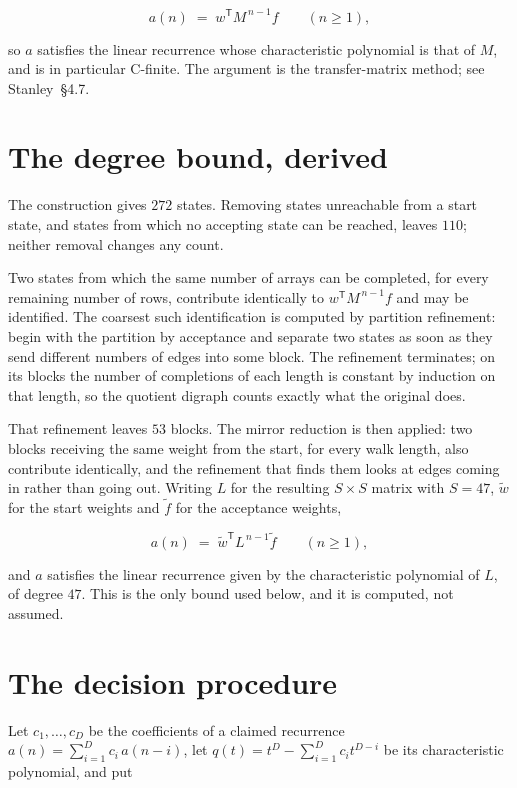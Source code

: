 \documentclass[11pt]{article}
\theoremstyle{definition}
\begin{document}
\[a(n) \;=\; w^{\mathsf T} M^{\,n-1} f \qquad (n \ge 1),\]

so $a$ satisfies the linear recurrence whose characteristic polynomial is that of $M$, and is in particular C-finite. The argument is the transfer-matrix method; see Stanley~\S4.7.

\section{The degree bound, derived}

The construction gives $272$ states. Removing states unreachable from a start state, and states from which no accepting state can be reached, leaves $110$; neither removal changes any count.

Two states from which the same number of arrays can be completed, for every remaining number of rows, contribute identically to $w^{\mathsf T}M^{\,n-1}f$ and may be identified. The coarsest such identification is computed by partition refinement: begin with the partition by acceptance and separate two states as soon as they send different numbers of edges into some block. The refinement terminates; on its blocks the number of completions of each length is constant by induction on that length, so the quotient digraph counts exactly what the original does.

That refinement leaves $53$ blocks. The mirror reduction is then applied: two blocks receiving the same weight from the start, for every walk length, also contribute identically, and the refinement that finds them looks at edges coming in rather than going out. Writing $L$ for the resulting $S \times S$ matrix with $S = 47$, $\tilde w$ for the start weights and $\tilde f$ for the acceptance weights,

\[a(n) \;=\; \tilde w^{\mathsf T} L^{\,n-1} \tilde f \qquad (n \ge 1),\]

and $a$ satisfies the linear recurrence given by the characteristic polynomial of $L$, of degree $47$. This is the only bound used below, and it is computed, not assumed.

\section{The decision procedure}

Let $c_1,\dots,c_D$ be the coefficients of a claimed recurrence $a(n) = \sum_{i=1}^{D} c_i\,a(n-i)$, let $q(t) = t^{D} - \sum_{i=1}^{D} c_i t^{D-i}$ be its characteristic polynomial, and put
\end{document}
